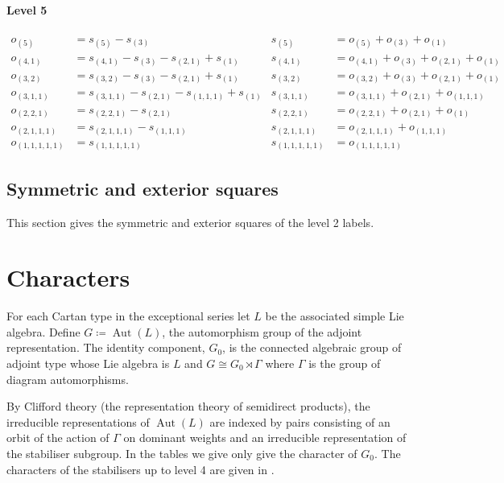\documentclass[12pt]{amsart}
\providecommand{\Aut}{\operatorname{Aut}}
\begin{document}
\paragraph{Level 5}
\begin{align*}
	o_{(5)} &= s_{(5)} - s_{(3)} 
	& s_{(5)} &= o_{(5)} + o_{(3)}  + o_{(1)} \\
	o_{(4,1)} &= s_{(4,1)} - s_{(3)} - s_{(2,1)} + s_{(1)} 
	& s_{(4,1)} &= o_{(4,1)} + o_{(3)} + o_{(2,1)}  + o_{(1)}  \\
	o_{(3,2)} &= s_{(3,2)} - s_{(3)} - s_{(2,1)} + s_{(1)} 
	& s_{(3,2)} &= o_{(3,2)} + o_{(3)} + o_{(2,1)}  + o_{(1)} \\
	o_{(3,1,1)} &= s_{(3,1,1)} - s_{(2,1)} - s_{(1,1,1)} + s_{(1)}
	& s_{(3,1,1)} &= o_{(3,1,1)} + o_{(2,1)}  + o_{(1,1,1)} \\
	o_{(2,2,1)} &= s_{(2,2,1)} - s_{(2,1)} 
	& s_{(2,2,1)} &= o_{(2,2,1)} + o_{(2,1)}  + o_{(1)} \\
	o_{(2,1,1,1)} &= s_{(2,1,1,1)} - s_{(1,1,1)} 
	& s_{(2,1,1,1)} &= o_{(2,1,1,1)} + o_{(1,1,1)} \\
	o_{(1,1,1,1,1)} &= s_{(1,1,1,1,1)} 
	& s_{(1,1,1,1,1)} &= o_{(1,1,1,1,1)}
\end{align*}







\subsection{Symmetric and exterior squares}
This section gives the symmetric and exterior squares of the level 2 labels.


\section{Characters}
For each Cartan type in the exceptional series let $L$ be the associated simple Lie algebra.  Define $G\coloneqq \Aut(L)$, the automorphism group of the adjoint representation.
The identity component, $G_0$, is the connected algebraic group of adjoint type whose Lie algebra is $L$ and $G\cong G_0 \rtimes \Gamma$ where $\Gamma$ is the group of diagram automorphisms.

By Clifford theory (the representation theory of semidirect products), the irreducible
representations of $\Aut(L)$ are indexed by pairs consisting of an orbit of the action
of $\Gamma$ on dominant weights and an irreducible representation of the stabiliser subgroup.
In the tables we give only give the character of $G_0$. The characters of the stabilisers
up to level 4 are given in \cite{cohen1996}.
\end{document}
